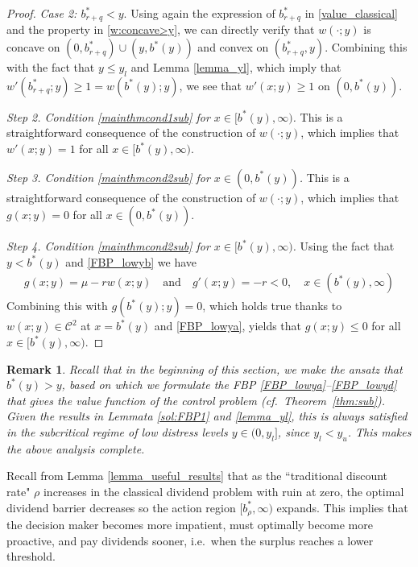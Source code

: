 \documentclass[11pt]{article} %
\newtheorem{remark}[theorem]{Remark}
\numberwithin{komcounter}{section}
\numberwithin{equation}{section}
\numberwithin{theorem}{section}
\begin{document}
\begin{proof}
{\it Case 2: $b^*_{r+q} < y$}.
Using again the expression of $b^*_{r+q}$ in \eqref{value_classical} and the property in \eqref{w:concave>y}, we can directly verify that $w(\cdot;y)$ is concave on $(0,b^*_{r+q}) \cup (y,b^*(y))$ and convex on $(b^*_{r+q},y)$. 
Combining this with the fact that $y \leq y_l$ and Lemma \ref{lemma_yl}, which imply that $w'(b^*_{r+q};y) \geq 1 = w(b^*(y);y)$, we see that $w'(x;y)\geq 1$ on $(0,b^*(y))$. 

\vspace{1mm}
{\it Step 2. Condition \eqref{mainthmcond1sub} for $x\in [b^*(y),\infty)$.} 
This is a straightforward consequence of the construction of $w(\cdot;y)$, which implies that $w'(x;y)=1$ for all $x \in [b^*(y),\infty)$.

\vspace{1mm}
{\it Step 3. Condition \eqref{mainthmcond2sub} for $x\in (0, b^*(y))$.} 
This is a straightforward consequence of the construction of $w(\cdot;y)$, which implies that $g(x;y)=0$ for all $x \in (0, b^*(y))$.

\vspace{1mm}
{\it Step 4. Condition \eqref{mainthmcond2sub} for $x\in [b^*(y),\infty)$.} 
Using the fact that $y < b^*(y)$ and \eqref{FBP_lowyb} we have  
\begin{align*}
g(x;y) = \mu - r 
w(x;y) 
\quad \text{and} \quad
g'(x;y) = - r 
< 0, 
\quad x\in (b^*(y),\infty)
\end{align*}
Combining this with $g(b^*(y);y)=0$, which holds true thanks to $w(x;y) \in \mathcal{C}^2$ at $x=b^*(y)$ and \eqref{FBP_lowya}, 
yields that $g(x;y) \leq 0$ for all $x\in [b^*(y),\infty)$.
\end{proof}




\begin{remark}
Recall that in the beginning of this section, we make the ansatz that $b^*(y)>y$, based on which we formulate the FBP \eqref{FBP_lowya}--\eqref{FBP_lowyd} that gives the value function of the control problem (cf.~Theorem~\ref{thm:sub}). 
Given the results in Lemmata \ref{sol:FBP1} and \ref{lemma_yl}, this is always satisfied in the subcritical regime of low distress levels $y \in (0,y_l]$, since $y_l < y_u$. This makes the above analysis complete.
\end{remark}

Recall from Lemma \ref{lemma_useful_results} that as the ``traditional discount rate" $\rho$ increases in the classical dividend problem with ruin at zero, the optimal dividend barrier decreases so the action region $[b^*_{\rho}, \infty)$ expands. 
This implies that the decision maker  becomes more impatient, must optimally become more proactive, and pay dividends sooner, i.e.~when the surplus reaches a lower threshold. 
\end{document}
